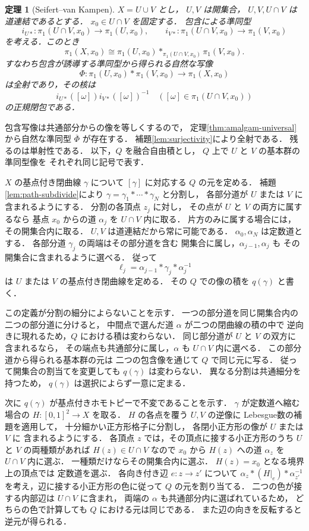 \documentclass[a5paper,10pt,onecolumn]{jsarticle}
\makeatletter
\theoremstyle{mathnotetheorem}
\newtheorem{theorem}{定理}[section]
\renewcommand{\proofname}{証明}
\renewenvironment{proof}[1][\proofname]{%
  \par\pushQED{\qed}\normalfont\topsep4\p@\@plus2\p@\relax
  \trivlist\item[\hskip\labelsep\bfseries #1]\ignorespaces
}{\popQED\endtrivlist\@endpefalse}
\makeatother
\begin{document}
\begin{theorem}[Seifert--van Kampen]\label{thm:svk}
$X=U\cup V$ とし，
$U,V$ は開集合，
$U,V,U\cap V$ は道連結であるとする．
$x_0\in U\cap V$ を固定する．
包含による準同型
\[
 i_{U*}:\pi_1(U\cap V,x_0)\to\pi_1(U,x_0),\qquad
 i_{V*}:\pi_1(U\cap V,x_0)\to\pi_1(V,x_0)
\]
を考える．このとき
\[
 \pi_1(X,x_0)\cong
 \pi_1(U,x_0)*_{\pi_1(U\cap V,x_0)}
 \pi_1(V,x_0).
\]
すなわち包含が誘導する準同型から得られる自然な写像
\[
 \Phi:\pi_1(U,x_0)*\pi_1(V,x_0)\to\pi_1(X,x_0)
\]
は全射であり，その核は
\[
 i_{U*}([\omega])i_{V*}([\omega])^{-1}
 \quad([\omega]\in\pi_1(U\cap V,x_0))
\]
の正規閉包である．
\end{theorem}
\begin{proof}
包含写像は共通部分からの像を等しくするので，
定理\ref{thm:amalgam-universal}から自然な準同型
$\overline\Phi$ が存在する．
補題\ref{lem:surjectivity}により全射である．
残るのは単射性である．
以下，$Q$ を融合自由積とし，
$Q$ 上で $U$ と $V$ の基本群の準同型像を
それぞれ同じ記号で表す．

$X$ の基点付き閉曲線 $\gamma$ について
$[\gamma]$ に対応する $Q$ の元を定める．
補題\ref{lem:path-subdivide}により
$\gamma=\gamma_1*\cdots*\gamma_N$ と分割し，
各部分道が $U$ または $V$ に含まれるようにする．
分割の各頂点 $z_j$ に対し，
その点が $U$ と $V$ の両方に属するなら
基点 $x_0$ からの道 $\alpha_j$ を
$U\cap V$ 内に取る．
片方のみに属する場合には，その開集合内に取る．
$U,V$ は道連結だから常に可能である．
$\alpha_0,\alpha_N$ は定数道とする．
各部分道 $\gamma_j$ の両端はその部分道を含む
開集合に属し，$\alpha_{j-1},\alpha_j$ も
その開集合に含まれるように選べる．
従って
\[
 \ell_j=\alpha_{j-1}*\gamma_j*\alpha_j^{-1}
\]
は $U$ または $V$ の基点付き閉曲線を定める．
その $Q$ での像の積を $q(\gamma)$ と書く．

この定義が分割の細分によらないことを示す．
一つの部分道を同じ開集合内の二つの部分道に分けると，
中間点で選んだ道 $\alpha$ が二つの閉曲線の積の中で
逆向きに現れるため，$Q$ における積は変わらない．
同じ部分道が $U$ と $V$ の双方に含まれるなら，
その端点も共通部分に属し，$\alpha$ も
$U\cap V$ 内に選べる．
この部分道から得られる基本群の元は
二つの包含像を通じて $Q$ で同じ元に写る．
従って開集合の割当てを変更しても $q(\gamma)$ は変わらない．
異なる分割は共通細分を持つため，
$q(\gamma)$ は選択によらず一意に定まる．

次に $q(\gamma)$ が基点付きホモトピーで不変であることを示す．
$\gamma$ が定数道へ縮む場合の
$H:[0,1]^2\to X$ を取る．
$H$ の各点を覆う $U,V$ の逆像に
Lebesgue数の補題を適用して，
十分細かい正方形格子に分割し，
各閉小正方形の像が $U$ または $V$ に
含まれるようにする．
各頂点 $z$ では，その頂点に接する小正方形のうち
$U$ と $V$ の両種類があれば
$H(z)\in U\cap V$ なので
$x_0$ から $H(z)$ への道 $\alpha_z$ を
$U\cap V$ 内に選ぶ．
一種類だけならその開集合内に選ぶ．
$H(z)=x_0$ となる境界上の頂点では
定数道を選ぶ．
各向き付き辺 $e:z\to z'$ について
$\alpha_z*(H|_e)*\alpha_{z'}^{-1}$
を考え，辺に接する小正方形の色に従って
$Q$ の元を割り当てる．
二つの色が接する内部辺は $U\cap V$ に含まれ，
両端の $\alpha$ も共通部分内に選ばれているため，
どちらの色で計算しても $Q$ における元は同じである．
また辺の向きを反転すると逆元が得られる．


\end{proof}
\end{document}
